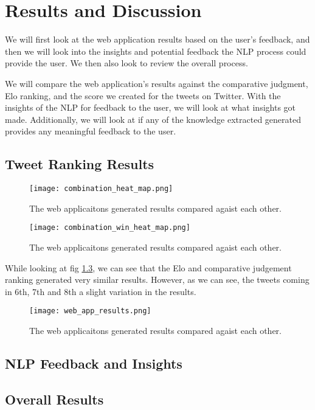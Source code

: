 \chapter{Results and Discussion}
\label{chap:results}

We will first look at the web application results based on the user's feedback, and then we will look into the insights and potential feedback the NLP process could provide the user. We then also look to review the overall process. 

We will compare the web application's results against the comparative judgment, Elo ranking, and the score we created for the tweets on Twitter. With the insights of the NLP for feedback to the user, we will look at what insights got made. Additionally, we will look at if any of the knowledge extracted generated provides any meaningful feedback to the user.



\section{Tweet Ranking Results} 
\label{sec:reaults_ranking}

\begin{figure}[h]
	\centering
	\texttt{[image: combination\_heat\_map.png]}
	\caption{The web applicaitons generated results compared agaist each other.}
	\label{fig:combinations}
	
\end{figure}

\begin{figure}[h]
	\centering
	\texttt{[image: combination\_win\_heat\_map.png]}
	\caption{The web applicaitons generated results compared agaist each other.}
	\label{fig:combination_wins}
	
\end{figure}


While looking at fig \ref{fig:web_app_results}, we can see that the Elo and comparative judgement ranking generated very similar results. However, as we can see, the tweets coming in 6th, 7th and 8th a slight variation in the results.

\begin{figure}[h]
	\centering
	\texttt{[image: web\_app\_results.png]}
	\caption{The web applicaitons generated results compared agaist each other.}
	\label{fig:web_app_results}
	
\end{figure}

\section{NLP Feedback and Insights}
\label{sec:reaults_NLP}

\section{Overall Results}
\label{sec:reaults_NLP}

